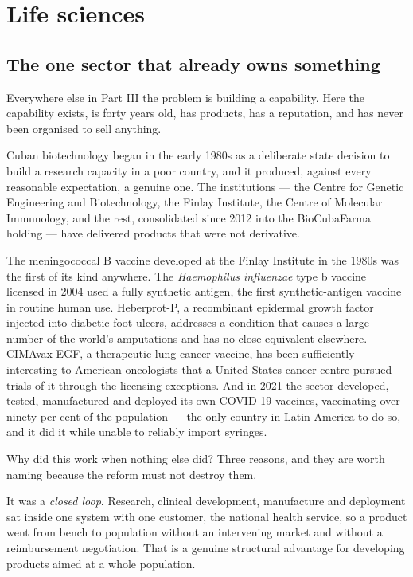 \chapter{Life sciences}
\label{ch:life}

\section{The one sector that already owns something}

Everywhere else in Part III the problem is building a capability. Here the
capability exists, is forty years old, has products, has a reputation, and has
never been organised to sell anything.

Cuban biotechnology began in the early 1980s as a deliberate state decision to
build a research capacity in a poor country, and it produced, against every
reasonable expectation, a genuine one. The institutions --- the Centre for
Genetic Engineering and Biotechnology, the Finlay Institute, the Centre of
Molecular Immunology, and the rest, consolidated since 2012 into the
BioCubaFarma holding --- have delivered products that were not derivative.

The meningococcal B vaccine developed at the Finlay Institute in the 1980s was
the first of its kind anywhere. The \emph{Haemophilus influenzae} type b vaccine
licensed in 2004 used a fully synthetic antigen, the first synthetic-antigen
vaccine in routine human use. Heberprot-P, a recombinant epidermal growth factor
injected into diabetic foot ulcers, addresses a condition that causes a large
number of the world's amputations and has no close equivalent elsewhere.
CIMAvax-EGF, a therapeutic lung cancer vaccine, has been sufficiently interesting
to American oncologists that a United States cancer centre pursued trials of it
through the licensing exceptions. And in 2021 the sector developed, tested,
manufactured and deployed its own COVID-19 vaccines, vaccinating over ninety per
cent of the population --- the only country in Latin America to do so, and it did
it while unable to reliably import syringes.\unv{}

Why did this work when nothing else did? Three reasons, and they are worth
naming because the reform must not destroy them.

It was a \emph{closed loop}. Research, clinical development, manufacture and
deployment sat inside one system with one customer, the national health service,
so a product went from bench to population without an intervening market and
without a reimbursement negotiation. That is a genuine structural advantage for
developing products aimed at a whole population.

